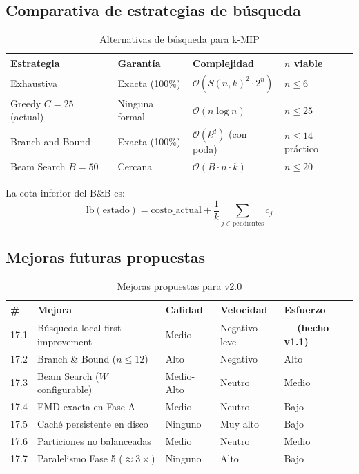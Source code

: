 \documentclass[12pt,letterpaper]{article}
\theoremstyle{definition}
\theoremstyle{remark}
\newcommand{\Stir}[2]{S(#1,#2)}
\newcommand{\BigO}[1]{\mathcal{O}(#1)}
\begin{document}
\subsection{Comparativa de estrategias de búsqueda}

\begin{table}[ht]
\centering
\caption{Alternativas de búsqueda para k-MIP}
\label{tab:alternativas}
\begin{tabular}{@{}l l l l@{}}
\toprule
\textbf{Estrategia} & \textbf{Garantía} & \textbf{Complejidad} & \textbf{$n$ viable} \\
\midrule
Exhaustiva        & Exacta (100\%) & $\BigO{\Stir{n}{k}^2 \cdot 2^n}$ & $n \leq 6$ \\
Greedy $C=25$ (actual) & Ninguna formal & $\BigO{n \log n}$ & $n \leq 25$ \\
Branch and Bound  & Exacta (100\%) & $\BigO{k^d}$ (con poda) & $n \leq 14$ práctico \\
Beam Search $B=50$ & Cercana & $\BigO{B \cdot n \cdot k}$ & $n \leq 20$ \\
\bottomrule
\end{tabular}
\end{table}

La cota inferior del B\&B es:
\begin{equation}
  \mathrm{lb}(\mathrm{estado}) =
  \mathrm{costo\_actual} + \frac{1}{k} \sum_{j \in \mathrm{pendientes}} c_j
\end{equation}

\subsection{Mejoras futuras propuestas}

\begin{table}[ht]
\centering
\caption{Mejoras propuestas para v2.0}
\label{tab:mejoras}
\begin{tabular}{@{}l p{4cm} l l l@{}}
\toprule
\textbf{\#} & \textbf{Mejora} & \textbf{Calidad} & \textbf{Velocidad} & \textbf{Esfuerzo} \\
\midrule
17.1 & Búsqueda local first-improvement & Medio & Negativo leve & --- \textbf{(hecho v1.1)} \\
17.2 & Branch \& Bound ($n \leq 12$) & Alto & Negativo & Alto \\
17.3 & Beam Search ($W$ configurable) & Medio-Alto & Neutro & Medio \\
17.4 & EMD exacta en Fase A & Medio & Neutro & Bajo \\
17.5 & Caché persistente en disco & Ninguno & Muy alto & Bajo \\
17.6 & Particiones no balanceadas & Medio & Neutro & Medio \\
17.7 & Paralelismo Fase 5 ($\approx3\times$) & Ninguno & Alto & Bajo \\
\bottomrule
\end{tabular}
\end{table}
\end{document}
